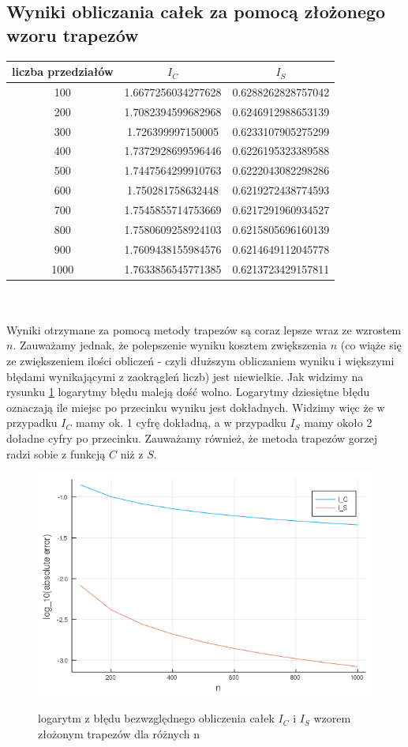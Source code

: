 \documentclass{article}
\begin{document}
\subsection*{Wyniki obliczania całek za pomocą złożonego wzoru trapezów}
\begin{tabular}{|c|c|c|} \hline
liczba przedziałów & $I_C$ & $I_S$ \\ \hline \hline
100 & 1.6677256034277628 & 0.6288262828757042 \\ \hline
200 & 1.7082394599682968 & 0.6246912988653139 \\ \hline
300 & 1.726399997150005  & 0.6233107905275299 \\ \hline
400 & 1.7372928699596446 & 0.6226195323389588 \\ \hline
500 & 1.7447564299910763 & 0.6222043082298286 \\ \hline
600 & 1.750281758632448  & 0.6219272438774593 \\ \hline
700 & 1.7545855714753669 & 0.6217291960934527 \\ \hline
800 & 1.7580609258924103 & 0.6215805696160139 \\ \hline
900 & 1.7609438155984576 & 0.6214649112045778 \\ \hline
1000& 1.7633856545771385 & 0.6213723429157811 \\ \hline
\end{tabular}\\
\\
Wyniki otrzymane za pomocą metody trapezów są coraz lepsze wraz ze wzrostem $n$. Zauważamy jednak, że polepszenie wyniku kosztem zwiększenia $n$ (co wiąże się ze zwiększeniem ilości obliczeń - czyli dłuższym obliczaniem wyniku i większymi błędami wynikającymi z zaokrągleń liczb) jest niewielkie. Jak widzimy na rysunku \ref{wykresA} logarytmy błędu maleją dość wolno. Logarytmy dziesiętne błędu oznaczają ile miejsc po przecinku wyniku jest dokładnych. Widzimy więc że w przypadku $I_C$ mamy ok. 1 cyfrę dokładną, a w przypadku $I_S$ mamy około 2 doładne cyfry po przecinku. Zauważamy również, że metoda trapezów gorzej radzi sobie z funkcją $C$ niż z $S$.
\begin{figure}[ht]
    \includegraphics[scale=0.5]{WykresAlogabsolute.png}
    \label{wykresA}
    \caption{logarytm z błędu bezwzględnego obliczenia całek $I_C$ i $I_S$ wzorem złożonym trapezów dla różnych n}
\end{figure}
\end{document}
